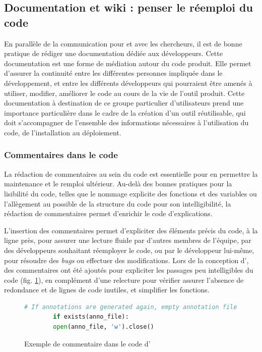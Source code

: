\subsection{Documentation et wiki : penser le réemploi du code}
En parallèle de la communication pour et avec les chercheurs, il est de bonne pratique de rédiger une documentation dédiée aux développeurs. Cette documentation est une forme de médiation autour du code produit. Elle permet d'assurer la continuité entre les différentes personnes impliquée dans le développement, et entre les différents développeurs qui pourraient être amenés à utiliser, modifier, améliorer le code au cours de la vie de l'outil produit. Cette documentation à destination de ce groupe particulier d'utilisateurs prend une importance particulière dans le cadre de la création d'un outil réutilisable, qui doit s'accompagner de l'ensemble des informations nécessaires à l'utilisation du code, de l'installation au déploiement.
	
    \subsubsection{Commentaires dans le code}
    La rédaction de commentaires au sein du code est essentielle pour en permettre la maintenance et le remploi ultérieur. Au-delà des bonnes pratiques pour la lisibilité du code, telles que le nommage explicite des fonctions et des variables ou l'allègement au possible de la structure du code pour son intelligibilité, la rédaction de commentaires permet d'enrichir le code d'explications. 
    
    L'insertion des commentaires permet d'expliciter des éléments précis du code, à la ligne près, pour assurer une lecture fluide par d'autres membres de l'équipe, par des développeurs souhaitant réemployer le code, ou par le développeur lui-même, pour résoudre des \textit{bugs} ou effectuer des modifications. Lors de la conception d'\exapi, des commentaires ont été ajoutés pour expliciter les passages peu intelligibles du code (fig. \ref{fig:commentaire_exapi}), en complément d'une relecture pour vérifier assurer l'absence de redondance et de lignes de code inutiles, et simplifier les fonctions. 
    
    \begin{figure}[h]
   		\begin{lstlisting}[language=Python]
   		# If annotations are generated again, empty annotation file
   		if exists(anno_file):
   		open(anno_file, 'w').close()\end{lstlisting}
   		\caption{Exemple de commentaire dans le code d'\exapi}
   		\label{fig:commentaire_exapi}
    \end{figure}
	
